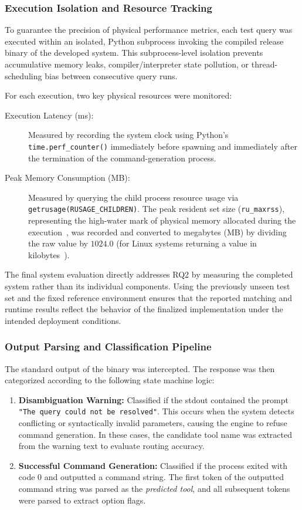 \subsubsection{Execution Isolation and Resource Tracking}
To guarantee the precision of physical performance metrics, each test query was executed within an isolated, Python subprocess invoking the compiled release binary of the developed system. This subprocess-level isolation prevents accumulative memory leaks, compiler/interpreter state pollution, or thread-scheduling bias between consecutive query runs. 

For each execution, two key physical resources were monitored:
\begin{description}
    \item[Execution Latency (ms):] Measured by recording the system clock using Python's \texttt{time.perf\_counter()} immediately before spawning and immediately after the termination of the command-generation process.
    \item[Peak Memory Consumption (MB):] Measured by querying the child process resource usage via \texttt{getrusage(RUSAGE\_CHILDREN)}. The peak resident set size (\texttt{ru\_maxrss}), representing the high-water mark of physical memory allocated during the execution~\cite{linux_man_getrusage}, was recorded and converted to megabytes (MB) by dividing the raw value by $1024.0$ (for Linux systems returning a value in kilobytes~\cite{linux_man_getrusage}).
\end{description}

The final system evaluation directly addresses RQ2 by measuring the completed system rather than its individual components. Using the previously unseen test set and the fixed reference environment ensures that the reported matching and runtime results reflect the behavior of the finalized implementation under the intended deployment conditions.

\subsubsection{Output Parsing and Classification Pipeline}
The standard output of the binary was intercepted. The response was then categorized according to the following state machine logic:
\begin{enumerate}
    \item \textbf{Disambiguation Warning:} Classified if the stdout contained the prompt \texttt{"The query could not be resolved"}. This occurs when the system detects conflicting or syntactically invalid parameters, causing the engine to refuse command generation. In these cases, the candidate tool name was extracted from the warning text to evaluate routing accuracy.
    \item \textbf{Successful Command Generation:} Classified if the process exited with code 0 and outputted a command string. The first token of the outputted command string was parsed as the \textit{predicted tool}, and all subsequent tokens were parsed to extract option flags.
\end{enumerate}

